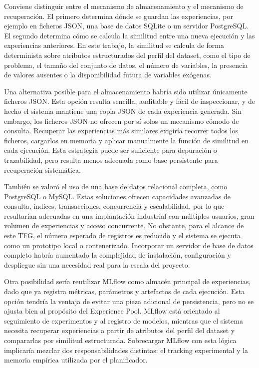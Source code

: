 \documentclass[12pt,a4paper]{article}
\theoremstyle{plain}
\begin{document}
Conviene distinguir entre el mecanismo de almacenamiento y el mecanismo de recuperación. El primero determina dónde se guardan las experiencias, por ejemplo en ficheros JSON, una base de datos SQLite o un servidor PostgreSQL. El segundo determina cómo se calcula la similitud entre una nueva ejecución y las experiencias anteriores. En este trabajo, la similitud se calcula de forma determinista sobre atributos estructurados del perfil del dataset, como el tipo de problema, el tamaño del conjunto de datos, el número de variables, la presencia de valores ausentes o la disponibilidad futura de variables exógenas.

Una alternativa posible para el almacenamiento habría sido utilizar únicamente ficheros JSON. Esta opción resulta sencilla, auditable y fácil de inspeccionar, y de hecho el sistema mantiene una copia JSON de cada experiencia generada. Sin embargo, los ficheros JSON no ofrecen por sí solos un mecanismo cómodo de consulta. Recuperar las experiencias más similares exigiría recorrer todos los ficheros, cargarlos en memoria y aplicar manualmente la función de similitud en cada ejecución. Esta estrategia puede ser suficiente para depuración o trazabilidad, pero resulta menos adecuada como base persistente para recuperación sistemática.

También se valoró el uso de una base de datos relacional completa, como PostgreSQL o MySQL. Estas soluciones ofrecen capacidades avanzadas de consulta, índices, transacciones, concurrencia y escalabilidad, por lo que resultarían adecuadas en una implantación industrial con múltiples usuarios, gran volumen de experiencias y acceso concurrente. No obstante, para el alcance de este TFG, el número esperado de registros es reducido y el sistema se ejecuta como un prototipo local o contenerizado. Incorporar un servidor de base de datos completo habría aumentado la complejidad de instalación, configuración y despliegue sin una necesidad real para la escala del proyecto.

Otra posibilidad sería reutilizar MLflow como almacén principal de experiencias, dado que ya registra métricas, parámetros y artefactos de cada ejecución. Esta opción tendría la ventaja de evitar una pieza adicional de persistencia, pero no se ajusta bien al propósito del Experience Pool. MLflow está orientado al seguimiento de experimentos y al registro de modelos, mientras que el sistema necesita recuperar experiencias a partir de atributos del perfil del dataset y compararlas por similitud estructurada. Sobrecargar MLflow con esta lógica implicaría mezclar dos responsabilidades distintas: el tracking experimental y la memoria empírica utilizada por el planificador.
\end{document}
